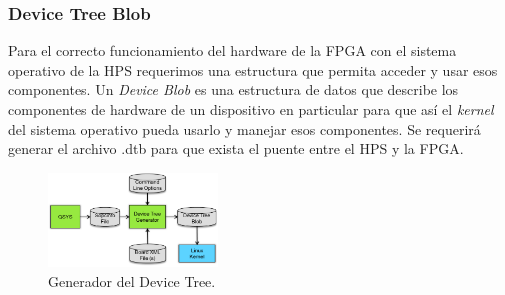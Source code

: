 \documentclass[conference]{IEEEtran}
\begin{document}
\subsubsection*{Device Tree Blob}
Para el correcto funcionamiento del hardware de la FPGA con el sistema operativo de la HPS requerimos una estructura que permita acceder y usar esos componentes. Un \textit{Device  Blob} es una estructura de datos que describe los componentes de hardware de un dispositivo en particular para que así el \textit{kernel} del sistema operativo pueda usarlo y manejar esos componentes. Se requerirá generar el archivo .dtb para que exista el puente entre el HPS y la FPGA.
\begin{figure}[h]
	\centerline{\includegraphics[width=0.4\textwidth]{img/dtb.png}}
	\caption{Generador del Device Tree.}
	\label{fig:hw02}
\end{figure}
\end{document}
